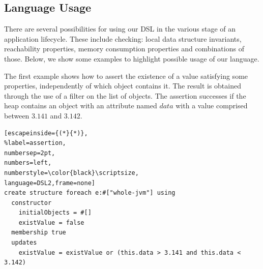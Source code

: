 

\subsection{Language Usage}

There are several possibilities for using our DSL in the various stage of an application lifecycle.
These include checking: local data structure invariants, reachability properties, memory consumption properties and combinations of those.
Below, we show some examples to highlight possible usage of our language. 
 
The first example shows how to assert the existence of a value satisfying some properties, independently of which object contains it. 
The result is obtained through the use of a filter on the list of objects.
The assertion successes if the heap contains an object with an attribute named $data$ with a value comprised between $3.141$ and $3.142$.

\begin{lstlisting}[escapeinside={(*}{*)},
%label=assertion, 
numbersep=2pt,
numbers=left,
numberstyle=\color{black}\scriptsize,
language=DSL2,frame=none]
create structure foreach e:#["whole-jvm"] using
  constructor
    initialObjects = #[]
    existValue = false
  membership true
  updates 
    existValue = existValue or (this.data > 3.141 and this.data < 3.142)
\end{lstlisting}

